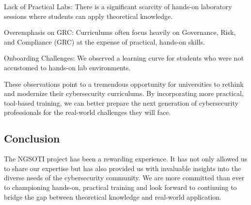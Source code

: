 \documentclass[10pt,a4paper]{report}
\begin{document}
\begin{description}
    \item {Lack of Practical Labs}: There is a significant scarcity of
hands-on laboratory sessions where students can apply theoretical knowledge.
    \item {Overemphasis on GRC}: Curriculums often focus heavily on Governance,
Risk, and Compliance (GRC) at the expense of practical, hands-on skills.
    \item {Onboarding Challenges}: We observed a learning curve for students
who were not accustomed to hands-on lab environments.
\end{description}

These observations point to a tremendous opportunity for universities to
rethink and modernize their cybersecurity curriculums. By incorporating more
practical, tool-based training, we can better prepare the next generation of
cybersecurity professionals for the real-world challenges they will face.

\subsection*{Conclusion}
The NGSOTI project has been a rewarding experience. It has not only allowed
us to share our expertise but has also provided us with invaluable insights
into the diverse needs of the cybersecurity community. We are more committed
than ever to championing hands-on, practical training and look forward to
continuing to bridge the gap between theoretical knowledge and real-world
application.
\end{document}
